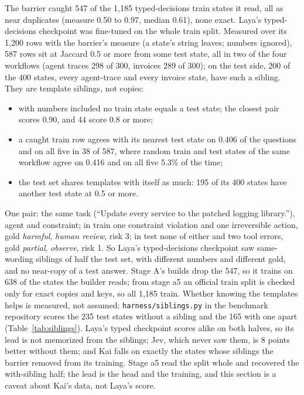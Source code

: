 The barrier caught 547 of the 1{,}185 typed-decisions train states it read, all
as near duplicates (measure 0.50 to 0.97, median 0.61), none exact. Laya's
typed-decisions checkpoint was fine-tuned on the whole train split. Measured
over its 1{,}200 rows with the barrier's measure (a state's string leaves;
numbers ignored), 587 rows sit at Jaccard 0.5 or more from some test state, all
in two of the four workflows (agent traces 298 of 300, invoices 289 of 300); on
the test side, 200 of the 400 states, every agent-trace and every invoice
state, have such a sibling. They are template siblings, not copies:
\begin{itemize}[leftmargin=1.5em]
  \item with numbers included no train state equals a test state; the closest
    pair scores 0.90, and 44 score 0.8 or more;
  \item a caught train row agrees with its nearest test state on 0.406 of the
    questions and on all five in 38 of 587, where random train and test states
    of the same workflow agree on 0.416 and on all five 5.3\% of the time;
  \item the test set shares templates with itself as much: 195 of its 400
    states have another test state at 0.5 or more.
\end{itemize}
One pair: the same task (``Update every service to the patched logging
library.''), agent and constraint; in train one constraint violation and one
irreversible action, gold \emph{harmful}, \emph{human review}, risk 3; in test
none of either and two tool errors, gold \emph{partial}, \emph{observe}, risk 1.
So Laya's typed-decisions checkpoint saw same-wording siblings of half the test
set, with different numbers and different gold, and no near-copy of a test
answer. Stage A's builds drop the 547, so it trains on 638 of the states the
builder reads; from stage a5 an official train split is checked only for exact
copies and keys, so all 1{,}185 train. Whether knowing the templates helps is measured, not assumed:
\texttt{harness/siblings.py} in the benchmark repository scores the 235 test
states without a sibling and the 165 with one apart
(Table~\ref{tab:siblings}). Laya's typed checkpoint scores alike on both
halves, so its lead is not memorized from the siblings; Jev, which never saw
them, is 8 points better without them; and Kai falls on exactly the states
whose siblings the barrier removed from its training. Stage a5 read the split
whole and recovered the with-sibling half; the lead is the head and the
training, and this section is a caveat about Kai's data, not Laya's score.

